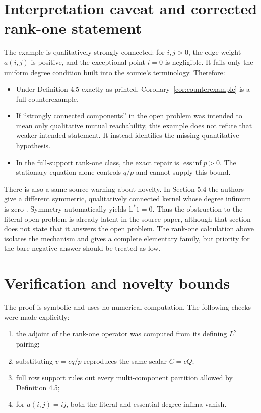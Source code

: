 \documentclass[11pt]{article}
\newcommand{\essinf}{\operatorname*{ess\,inf}}
\newcommand{\Lop}{\mathbb L}
\begin{document}
\section{Interpretation caveat and corrected rank-one statement}
\label{sec:caveat}

The example is qualitatively strongly connected: for $i,j>0$, the edge weight
$a(i,j)$ is positive, and the exceptional point $i=0$ is negligible. It fails
only the uniform degree condition built into the source's terminology.
Therefore:
\begin{itemize}
\item Under Definition 4.5 exactly as printed, Corollary~\ref{cor:counterexample}
      is a full counterexample.
\item If ``strongly connected components'' in the open problem was intended to
      mean only qualitative mutual reachability, this example does not refute
      that weaker intended statement. It instead identifies the missing
      quantitative hypothesis.
\item In the full-support rank-one class, the exact repair is
      $\essinf p>0$. The stationary equation alone controls $q/p$ and cannot
      supply this bound.
\end{itemize}

There is also a same-source warning about novelty. In Section 5.4 the authors
give a different symmetric, qualitatively connected kernel whose degree
infimum is zero \cite{source}. Symmetry automatically yields $\Lop^*1=0$.
Thus the obstruction to the literal open problem is already latent in the
source paper, although that section does not state that it answers the open
problem. The rank-one calculation above isolates the mechanism and gives a
complete elementary family, but priority for the bare negative answer should
be treated as low.

\section{Verification and novelty bounds}

The proof is symbolic and uses no numerical computation. The following checks
were made explicitly:
\begin{enumerate}
\item the adjoint of the rank-one operator was computed from its defining
      $L^2$ pairing;
\item substituting $v=cq/p$ reproduces the same scalar $C=cQ$;
\item full row support rules out every multi-component partition allowed by
      Definition 4.5;
\item for $a(i,j)=ij$, both the literal and essential degree infima vanish.
\end{enumerate}
\end{document}
